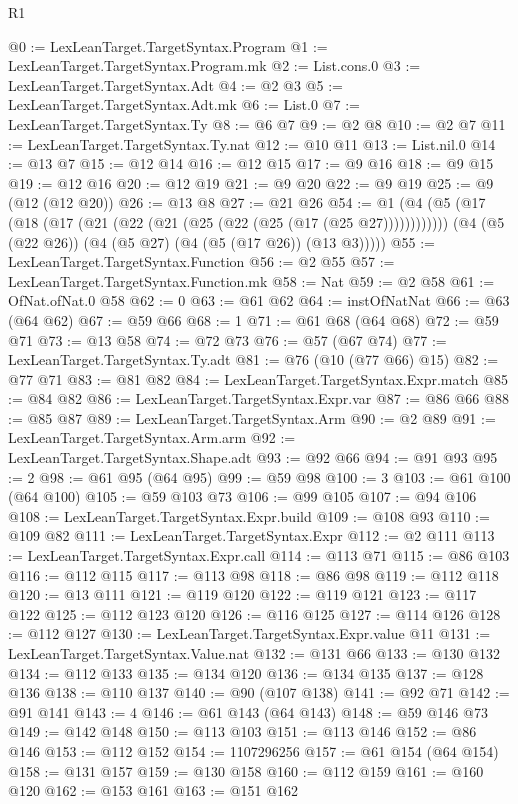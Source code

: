 \begin{lexlean}{R1}
\begin{coremodule}
@0 := LexLeanTarget.TargetSyntax.Program
@1 := LexLeanTarget.TargetSyntax.Program.mk
@2 := List.cons.{0}
@3 := LexLeanTarget.TargetSyntax.Adt
@4 := @2 @3
@5 := LexLeanTarget.TargetSyntax.Adt.mk
@6 := List.{0}
@7 := LexLeanTarget.TargetSyntax.Ty
@8 := @6 @7
@9 := @2 @8
@10 := @2 @7
@11 := LexLeanTarget.TargetSyntax.Ty.nat
@12 := @10 @11
@13 := List.nil.{0}
@14 := @13 @7
@15 := @12 @14
@16 := @12 @15
@17 := @9 @16
@18 := @9 @15
@19 := @12 @16
@20 := @12 @19
@21 := @9 @20
@22 := @9 @19
@25 := @9 (@12 (@12 @20))
@26 := @13 @8
@27 := @21 @26
@54 := @1
    (@4
      (@5 (@17 (@18 (@17 (@21 (@22 (@21 (@25 (@22 (@25 (@17 (@25 @27))))))))))))
      (@4 (@5 (@22 @26)) (@4 (@5 @27) (@4 (@5 (@17 @26)) (@13 @3)))))
@55 := LexLeanTarget.TargetSyntax.Function
@56 := @2 @55
@57 := LexLeanTarget.TargetSyntax.Function.mk
@58 := Nat
@59 := @2 @58
@61 := OfNat.ofNat.{0} @58
@62 := 0
@63 := @61 @62
@64 := instOfNatNat
@66 := @63 (@64 @62)
@67 := @59 @66
@68 := 1
@71 := @61 @68 (@64 @68)
@72 := @59 @71
@73 := @13 @58
@74 := @72 @73
@76 := @57 (@67 @74)
@77 := LexLeanTarget.TargetSyntax.Ty.adt
@81 := @76 (@10 (@77 @66) @15)
@82 := @77 @71
@83 := @81 @82
@84 := LexLeanTarget.TargetSyntax.Expr.match
@85 := @84 @82
@86 := LexLeanTarget.TargetSyntax.Expr.var
@87 := @86 @66
@88 := @85 @87
@89 := LexLeanTarget.TargetSyntax.Arm
@90 := @2 @89
@91 := LexLeanTarget.TargetSyntax.Arm.arm
@92 := LexLeanTarget.TargetSyntax.Shape.adt
@93 := @92 @66
@94 := @91 @93
@95 := 2
@98 := @61 @95 (@64 @95)
@99 := @59 @98
@100 := 3
@103 := @61 @100 (@64 @100)
@105 := @59 @103 @73
@106 := @99 @105
@107 := @94 @106
@108 := LexLeanTarget.TargetSyntax.Expr.build
@109 := @108 @93
@110 := @109 @82
@111 := LexLeanTarget.TargetSyntax.Expr
@112 := @2 @111
@113 := LexLeanTarget.TargetSyntax.Expr.call
@114 := @113 @71
@115 := @86 @103
@116 := @112 @115
@117 := @113 @98
@118 := @86 @98
@119 := @112 @118
@120 := @13 @111
@121 := @119 @120
@122 := @119 @121
@123 := @117 @122
@125 := @112 @123 @120
@126 := @116 @125
@127 := @114 @126
@128 := @112 @127
@130 := LexLeanTarget.TargetSyntax.Expr.value @11
@131 := LexLeanTarget.TargetSyntax.Value.nat
@132 := @131 @66
@133 := @130 @132
@134 := @112 @133
@135 := @134 @120
@136 := @134 @135
@137 := @128 @136
@138 := @110 @137
@140 := @90 (@107 @138)
@141 := @92 @71
@142 := @91 @141
@143 := 4
@146 := @61 @143 (@64 @143)
@148 := @59 @146 @73
@149 := @142 @148
@150 := @113 @103
@151 := @113 @146
@152 := @86 @146
@153 := @112 @152
@154 := 1107296256
@157 := @61 @154 (@64 @154)
@158 := @131 @157
@159 := @130 @158
@160 := @112 @159
@161 := @160 @120
@162 := @153 @161
@163 := @151 @162

\end{coremodule}
\end{lexlean}
